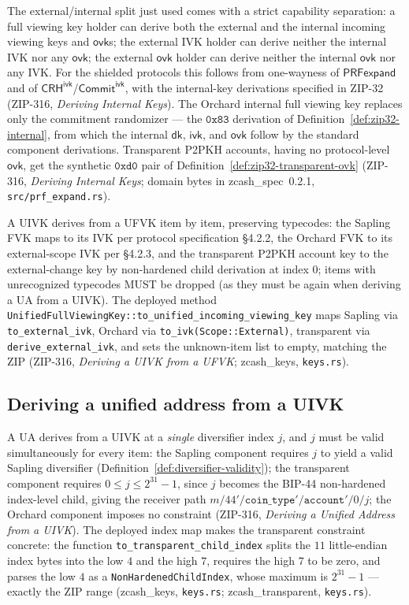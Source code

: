 \documentclass[11pt,a4paper]{article}
\theoremstyle{definition}
\newcommand{\CommitIvk}{\ensuremath{\mathsf{Commit}^{\mathsf{ivk}}}}
\newcommand{\ivk}{\ensuremath{\mathsf{ivk}}}
\newcommand{\ovk}{\ensuremath{\mathsf{ovk}}}
\newcommand{\dk}{\ensuremath{\mathsf{dk}}}
\begin{document}
The external/internal split just used comes with a strict capability
separation: a full viewing key holder can derive both the external and the
internal incoming viewing keys and $\ovk$s; the external IVK holder can
derive neither the internal IVK nor any $\ovk$; the external $\ovk$ holder
can derive neither the internal $\ovk$ nor any IVK. For the shielded
protocols this follows from one-wayness of $\mathsf{PRFexpand}$ and of
$\mathsf{CRH}^{\mathsf{ivk}}$/$\CommitIvk$, with the internal-key
derivations specified in ZIP-32 (ZIP-316, \emph{Deriving Internal Keys}).
The Orchard internal full viewing key replaces only the commitment
randomizer --- the $\mathtt{0x83}$ derivation of
Definition~\ref{def:zip32-internal}, from which the internal $\dk$,
$\ivk$, and $\ovk$ follow by the standard component derivations.
Transparent P2PKH accounts, having no protocol-level $\ovk$, get the
synthetic $\mathtt{0xd0}$ pair of
Definition~\ref{def:zip32-transparent-ovk} (ZIP-316, \emph{Deriving
Internal Keys}; domain bytes in \textsf{zcash\_spec}~0.2.1,
\texttt{src/prf\_expand.rs}).

A UIVK derives from a UFVK item by item, preserving typecodes: the Sapling
FVK maps to its IVK per protocol specification \S4.2.2, the Orchard FVK to
its external-scope IVK per \S4.2.3, and the transparent P2PKH account key
to the external-change key by non-hardened child derivation at index $0$;
items with unrecognized typecodes MUST be dropped (as they must be again
when deriving a UA from a UIVK). The deployed method
\texttt{UnifiedFullViewingKey::}\allowbreak\texttt{to\_unified\_incoming\_viewing\_key}
maps Sapling via \texttt{to\_external\_ivk}, Orchard via
\texttt{to\_ivk(Scope::External)}, transparent via
\texttt{derive\_external\_ivk}, and sets the unknown-item list to empty,
matching the ZIP (ZIP-316, \emph{Deriving a UIVK from a UFVK};
\textsf{zcash\_keys}, \texttt{keys.rs}).

\subsection{Deriving a unified address from a UIVK}\label{sec:addresses-ua-from-uivk}

A UA derives from a UIVK at a \emph{single} diversifier index $j$, and $j$
must be valid simultaneously for every item: the Sapling component
requires $j$ to yield a valid Sapling diversifier
(Definition~\ref{def:diversifier-validity}); the transparent component
requires $0 \le j \le 2^{31}-1$, since $j$ becomes the BIP-44 non-hardened
index-level child, giving the receiver path
$m/44'/\mathtt{coin\_type}'/\mathtt{account}'/0/j$; the Orchard component
imposes no constraint (ZIP-316, \emph{Deriving a Unified Address from a
UIVK}). The deployed index map makes the transparent constraint concrete:
the function \texttt{to\_transparent\_child\_index} splits the $11$
little-endian index bytes into the low $4$ and the high $7$, requires the
high $7$ to be zero, and parses the low $4$ as a
\texttt{NonHardenedChildIndex}, whose maximum is $2^{31}-1$ --- exactly
the ZIP range (\textsf{zcash\_keys}, \texttt{keys.rs};
\textsf{zcash\_transparent}, \texttt{keys.rs}).
\end{document}
